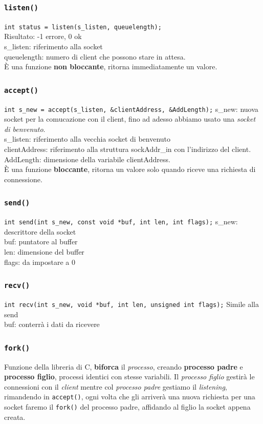 \subsubsection*{\texttt{listen()}}
\texttt{int status = listen(s\_listen, queuelength);} \\ 
Risultato: -1 errore, 0 ok \\ 
s\_listen: riferimento alla socket \\ 
queuelength: numero di client che possono stare in attesa. \\ 
È una funzione \textbf{non bloccante}, ritorna immediatamente un valore. 

\subsubsection*{\texttt{accept()}}
\texttt{int s\_new = accept(s\_listen, \&clientAddress, \&AddLength);}
s\_new: nuova socket per la comucazione con il client, fino ad adesso abbiamo usato una \textit{socket di benvenuto}. \\ 
s\_listen: riferimento alla vecchia socket di benvenuto \\ 
clientAddress: riferimento alla struttura sockAddr\_in con l'indirizzo del client. \\ 
AddLength: dimensione della variabile clientAddress. \\ 
È una funzione \textbf{bloccante}, ritorna un valore solo quando riceve una richiesta di connessione. 

\subsubsection*{\texttt{send()}}
\texttt{int send(int s\_new, const void *buf, int len, int flags);}
s\_new: descrittore della socket \\ 
buf: puntatore al buffer \\ 
len: dimensione del buffer \\ 
flags: da impostare a 0 

\subsubsection*{\texttt{recv()}}
\texttt{int recv(int s\_new, void *buf, int len, unsigned int flags);}
Simile alla send \\ 
buf: conterrà i dati da ricevere 

\subsubsection*{\texttt{fork()}}
Funzione della libreria di C, \textbf{biforca} il \textit{processo}, creando \textbf{processo padre} e \textbf{processo figlio}, processi identici con stesse variabili. Il \textit{processo figlio} gestirà le connessioni con il \textit{client} mentre col \textit{processo padre} gestiamo il \textit{listening}, rimandendo in \texttt{accept()}, ogni volta che gli arriverà una nuova richiesta per una socket faremo il \texttt{fork()} del processo padre, affidando al figlio la socket appena creata.

